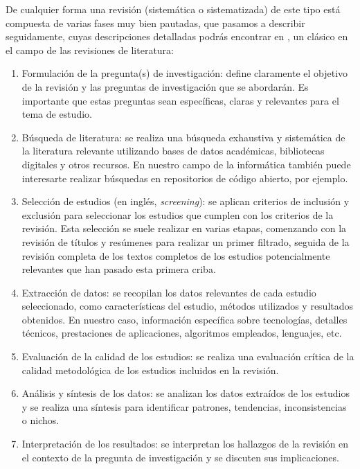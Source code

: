 De cualquier forma una revisión (sistemática o sistematizada) de este tipo está compuesta de varias fases muy bien pautadas, que pasamos a describir seguidamente, cuyas descripciones detalladas podrás encontrar en  \cite{booth2021a}, un clásico en el campo de las revisiones de literatura:

\begin{enumerate}
\item Formulación de la pregunta(s) de investigación: define claramente el objetivo de la revisión y las preguntas de investigación que se abordarán. Es importante que estas preguntas sean específicas, claras y relevantes para el tema de estudio.

\item Búsqueda de literatura: se realiza una búsqueda exhaustiva y sistemática de la literatura relevante utilizando bases de datos académicas, bibliotecas digitales y otros recursos. En nuestro campo de la informática también puede interesarte realizar búsquedas en repositorios de código abierto, por ejemplo.

\item Selección de estudios (en inglés, \textit{screening}): se aplican criterios de inclusión y exclusión para seleccionar los estudios que cumplen con los criterios de la revisión. Esta selección se suele realizar en varias etapas, comenzando con la revisión de títulos y resúmenes para realizar un primer filtrado, seguida de la revisión completa de los textos completos de los estudios potencialmente relevantes que han pasado esta primera criba.

\item Extracción de datos: se recopilan los datos relevantes de cada estudio seleccionado, como características del estudio, métodos utilizados y resultados obtenidos. En nuestro caso, información específica sobre tecnologías, detalles técnicos, prestaciones de aplicaciones, algoritmos empleados, lenguajes, etc.

\item Evaluación de la calidad de los estudios: se realiza una evaluación crítica de la calidad metodológica de los estudios incluidos en la revisión.

\item Análisis y síntesis de los datos: se analizan los datos extraídos de los estudios y se realiza una síntesis para identificar patrones, tendencias, inconsistencias o nichos.

\item Interpretación de los resultados: se interpretan los hallazgos de la revisión en el contexto de la pregunta de investigación y se discuten sus implicaciones.


\end{enumerate}
